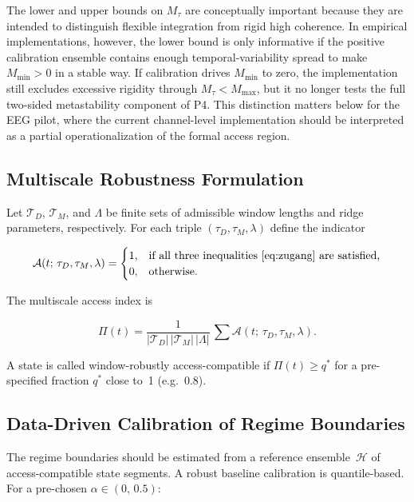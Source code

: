 ﻿\documentclass[11pt,a4paper]{article}
\theoremstyle{plain}
\theoremstyle{definition}
\theoremstyle{remark}
\newcommand{\Mtau}{M_{\tau}}
\newcommand{\Mmin}{M_{\min}}
\newcommand{\Mmax}{M_{\max}}
\begin{document}
The lower and upper bounds on $M_\tau$ are conceptually important because they are intended to distinguish flexible integration from rigid high coherence. In empirical implementations, however, the lower bound is only informative if the positive calibration ensemble contains enough temporal-variability spread to make $\Mmin > 0$ in a stable way. If calibration drives $\Mmin$ to zero, the implementation still excludes excessive rigidity through $\Mtau < \Mmax$, but it no longer tests the full two-sided metastability component of P4. This distinction matters below for the EEG pilot, where the current channel-level implementation should be interpreted as a partial operationalization of the formal access region.

\subsection{Multiscale Robustness Formulation}

Let $\mathcal{T}_D$, $\mathcal{T}_M$, and $\Lambda$ be finite sets of admissible window lengths and ridge parameters, respectively. For each triple $(\tau_D, \tau_M, \lambda)$ define the indicator

\begin{equation}
\mathcal{A}(t;\,\tau_D,\tau_M,\lambda) =
\begin{cases}
1, & \text{if all three inequalities~\eqref{eq:zugang} are satisfied,}\\
0, & \text{otherwise.}
\end{cases}
\end{equation}

The multiscale access index is

\begin{equation}
\label{eq:Pi}
\Pi(t) = \frac{1}{|\mathcal{T}_D|\,|\mathcal{T}_M|\,|\Lambda|}\,\sum \mathcal{A}(t;\,\tau_D,\tau_M,\lambda).
\end{equation}

A state is called window-robustly access-compatible if $\Pi(t) \geq q^*$ for a pre-specified fraction $q^*$ close to~1 (e.g.\ 0.8).

\subsection{Data-Driven Calibration of Regime Boundaries}

The regime boundaries should be estimated from a reference ensemble~$\mathcal{H}$ of access-compatible state segments. A robust baseline calibration is quantile-based. For a pre-chosen $\alpha \in (0,\,0.5)$:
\end{document}
